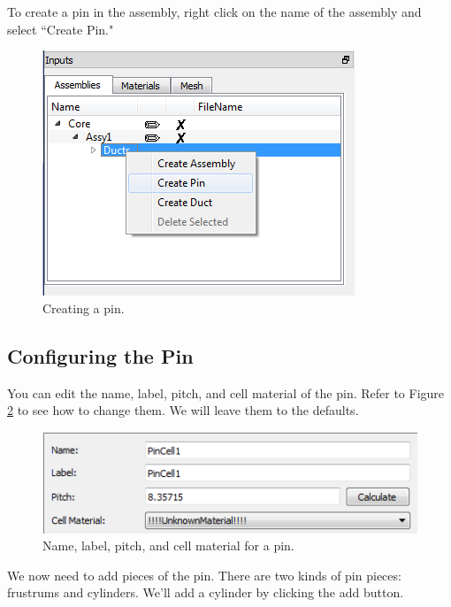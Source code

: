 To create a pin in the assembly, right click on the name of the assembly and select ``Create Pin."

\begin{figure}[H]
	\begin{center}
		\includegraphics[width=0.5\linewidth]{Images/hex-9.png}
		\caption{Creating a pin.}
		\label{fig:Hex9}
	\end{center}
\end{figure}

\subsection{Configuring the Pin}

You can edit the name, label, pitch, and cell material of the pin.  Refer to Figure \ref{fig:Hex10} to see how to change them.  We will leave them to the defaults.

\begin{figure}[H]
	\begin{center}
		\includegraphics[width=0.5\linewidth]{Images/hex-10.png}
		\caption{Name, label, pitch, and cell material for a pin.}
		\label{fig:Hex10}
	\end{center}
\end{figure}

We now need to add pieces of the pin.  There are two kinds of pin pieces: frustrums and cylinders.  We'll add a cylinder by clicking the add button.

